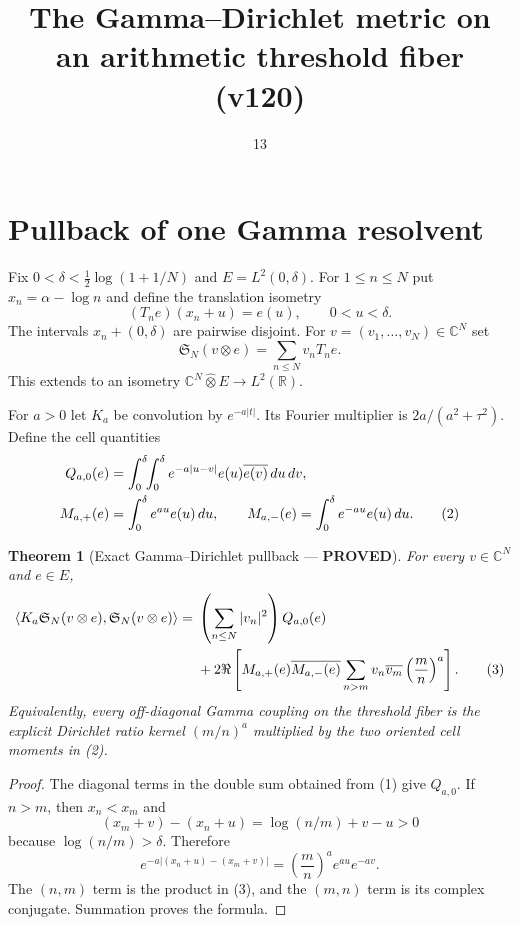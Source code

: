 \documentclass[11pt]{article}
\title{The Gamma--Dirichlet metric on an arithmetic threshold fiber (v120)}
\date{13}
\newcommand{\PROVED}{\textcolor{green!40!black}{\textbf{PROVED}}}
\newtheorem{theorem}{Theorem}
\begin{document}
\maketitle

\section{Pullback of one Gamma resolvent}

Fix $0<\delta<\frac12\log(1+1/N)$ and $E=L^2(0,\delta)$.
For $1\le n\le N$ put $x_n=\alpha-\log n$ and define the translation
isometry
\[
 (T_ne)(x_n+u)=e(u),\qquad 0<u<\delta.
\]
The intervals $x_n+(0,\delta)$ are pairwise disjoint.  For
$v=(v_1,\ldots,v_N)\in\mathbb C^N$ set
\begin{equation}
 \mathfrak S_N(v\otimes e)=\sum_{n\le N}v_nT_ne.             \tag{1}
\end{equation}
This extends to an isometry $\mathbb C^N\widehat\otimes E\to L^2(\mathbb R)$.

For $a>0$ let $K_a$ be convolution by $e^{-a|t|}$.  Its Fourier multiplier
is $2a/(a^2+\tau^2)$.  Define the cell quantities
\begin{align}
 Q_{a,0}(e)&=\int_0^\delta\!\!\int_0^\delta
 e^{-a|u-v|}e(u)\overline{e(v)}\,du\,dv,\notag\\
 M_{a,+}(e)&=\int_0^\delta e^{au}e(u)\,du,\qquad
 M_{a,-}(e)=\int_0^\delta e^{-au}e(u)\,du.                   \tag{2}
\end{align}

\begin{theorem}[Exact Gamma--Dirichlet pullback --- \PROVED]
For every $v\in\mathbb C^N$ and $e\in E$,
\begin{align}
 \langle K_a\mathfrak S_N(v\otimes e),
               \mathfrak S_N(v\otimes e)\rangle
={}&\left(\sum_{n\le N}|v_n|^2\right)Q_{a,0}(e)\notag\\
 &+2\Re\left[
 M_{a,+}(e)\overline{M_{a,-}(e)}
 \sum_{n>m}v_n\overline{v_m}\left(\frac mn\right)^a
 \right].                                                   \tag{3}
\end{align}
Equivalently, every off-diagonal Gamma coupling on the threshold fiber is
the explicit Dirichlet ratio kernel $(m/n)^a$ multiplied by the two
oriented cell moments in (2).
\end{theorem}

\begin{proof}
The diagonal terms in the double sum obtained from (1) give $Q_{a,0}$.
If $n>m$, then $x_n<x_m$ and
\[
 (x_m+v)-(x_n+u)=\log(n/m)+v-u>0
\]
because $\log(n/m)>\delta$.  Therefore
\[
 e^{-a|(x_n+u)-(x_m+v)|}
 =\left(\frac mn\right)^ae^{au}e^{-av}.
\]
The $(n,m)$ term is the product in (3), and the $(m,n)$ term is its complex
conjugate.  Summation proves the formula.
\end{proof}
\end{document}
